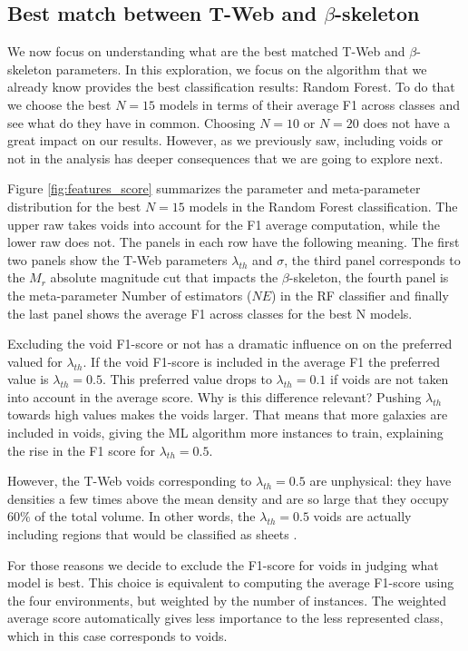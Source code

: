 \documentclass[usenatbib]{mnras}
\begin{document}
\subsection{Best match between T-Web and $\beta$-skeleton}

We now focus on understanding what are the best matched T-Web and
$\beta$-skeleton parameters.
In this exploration, we focus on the algorithm that we already know
provides the best classification results: Random Forest. 
To do that we choose the best $N=15$ models in terms of their average F1 across
classes and see what do they have in common.
Choosing $N=10$ or $N=20$ does not have a great impact on our
results. 
However, as we previously saw, including voids or not in the analysis
has deeper consequences that we are going to explore next.

Figure \ref{fig:features_score} summarizes the parameter and meta-parameter
distribution for the best $N=15$ models in the Random Forest
classification.
The upper raw takes voids into account for the F1 average computation,
while the lower raw does not.
The panels in each row have the following meaning.
The first two panels show the T-Web parameters
$\lambda_{th}$ and $\sigma$, the third panel corresponds to the $M_r$
absolute magnitude cut that impacts the $\beta$-skeleton, the fourth panel is the meta-parameter Number of estimators ($NE$) in the RF
classifier and finally the last panel shows the average F1 across classes for the best N models. 

Excluding the void F1-score or not has a dramatic influence on
on the preferred valued for $\lambda_{th}$. 
If the void F1-score is included in the average F1 the preferred value is
$\lambda_{th}=0.5$. 
This preferred value drops to $\lambda_{th}=0.1$  if voids are not taken into account in the average score.
Why is this difference relevant?
Pushing $\lambda_{th}$ towards high values makes the voids larger.
That means that more galaxies are included in voids, giving the ML algorithm more instances to train, explaining the rise in the F1 score for $\lambda_{th}=0.5$.

However, the T-Web voids corresponding to $\lambda_{th}=0.5$ are unphysical: they have densities a few times above the mean
density and are so large that they occupy $60\%$ of the total volume.
In other words, the $\lambda_{th}=0.5$ voids are actually including regions that would be classified as sheets
\citep{Bustamante2015, Forero-Romero2009}. 

For those reasons we decide to exclude the F1-score for voids in
judging what model is best.
This choice is equivalent to computing the average F1-score using the
four environments, but weighted by the number of instances. 
The weighted average score automatically gives less importance to the
less represented class, which in this case corresponds to voids.
\end{document}
